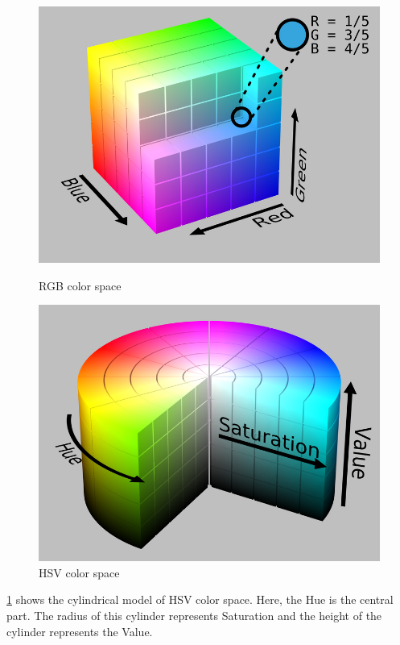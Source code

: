 \begin{figure}[htbp]
\begin{minipage}[t]{0.45\linewidth}
    \includegraphics[width=\linewidth]{images/RGB.png}
    \caption{RGB color space}
    \label{f:rgb}
\end{minipage}
    \hfill
\begin{minipage}[t]{0.45\linewidth}
    \includegraphics[width=\linewidth]{images/HSV.png}
    \caption{HSV color space}
    \label{f:hsv}
\end{minipage} 
\end{figure}

\ref{f:hsv} shows the cylindrical model of HSV color space.
Here, the Hue is the central part.
The radius of this cylinder represents Saturation and the height of the cylinder represents the Value.


